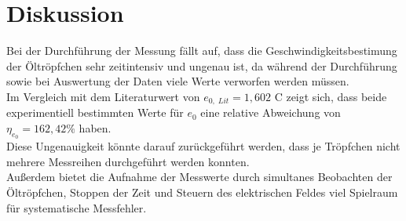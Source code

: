 \section{Diskussion}
\label{sec:Diskussion}


Bei der Durchführung der Messung fällt auf, dass die 
Geschwindigkeitsbestimung der Öltröpfchen sehr zeitintensiv und 
ungenau ist, da während der Durchführung sowie bei Auswertung der Daten viele Werte verworfen werden müssen. \\
Im Vergleich mit dem Literaturwert von $e_{0, \; Lit} = 1,602$ C \cite{enull} zeigt sich, dass beide experimentiell bestimmten Werte für $e_0$ eine 
relative Abweichung von $\eta_{e_0} = 162,42 \%$ haben. \\
Diese Ungenauigkeit könnte darauf zurückgeführt werden, dass je Tröpfchen nicht mehrere Messreihen durchgeführt werden 
konnten. \\ 
Außerdem bietet die Aufnahme der Messwerte durch simultanes Beobachten der Öltröpfchen, Stoppen der Zeit und Steuern des 
elektrischen Feldes viel Spielraum für systematische Messfehler. \\